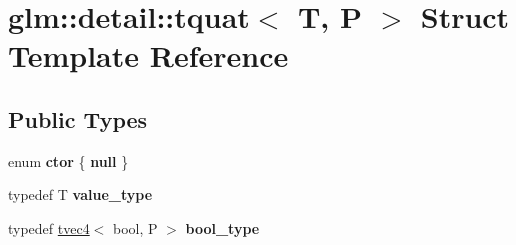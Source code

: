 \hypertarget{structglm_1_1detail_1_1tquat}{}\section{glm\+:\+:detail\+:\+:tquat$<$ T, P $>$ Struct Template Reference}
\label{structglm_1_1detail_1_1tquat}
\subsection*{Public Types}
\begin{DoxyCompactItemize}
\item 
enum {\bfseries ctor} \{ {\bfseries null}
 \}\hypertarget{structglm_1_1detail_1_1tquat_a61a530a53df553ec85f45e6b5ce6d7c3}{}\label{structglm_1_1detail_1_1tquat_a61a530a53df553ec85f45e6b5ce6d7c3}

\item 
typedef T {\bfseries value\+\_\+type}\hypertarget{structglm_1_1detail_1_1tquat_af313f5388bc71d19ec712f20fe24cc9b}{}\label{structglm_1_1detail_1_1tquat_af313f5388bc71d19ec712f20fe24cc9b}

\item 
typedef \hyperlink{structglm_1_1detail_1_1tvec4}{tvec4}$<$ bool, P $>$ {\bfseries bool\+\_\+type}\hypertarget{structglm_1_1detail_1_1tquat_a22ca5a5296466eb23f4f499ffecc8d46}{}\label{structglm_1_1detail_1_1tquat_a22ca5a5296466eb23f4f499ffecc8d46}

\end{DoxyCompactItemize}
